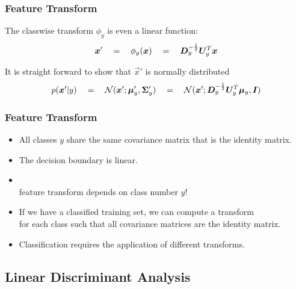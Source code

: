 \begin{frame}
  \frametitle{Feature Transform \cont}
 
  The classwise transform $\phi_y$ is even a linear function:
%
  \begin{displaymath}
    {\bm x}' \quad = \quad \phi_y({\bm x}) \quad = \quad {\bm D}_y^{-\frac{1}{2}}{\bm U}^T_y{\bm x}
  \end{displaymath}
  \pause 

  It is straight forward  to show that $\vec x'$ is normally distributed
  \begin{displaymath}
     p({\bm x}' | y) \quad = \quad \mathcal {N} ({\bm x}' ; {\bm \mu}'_y, {\bm \Sigma}'_y) 
                    \quad = \quad \mathcal {N} ({\bm x}' ; {\bm D}_y^{-\frac{1}{2}}{\bm U}^T_y{\bm \mu}_y, {\bm I}) 
  \end{displaymath}
\end{frame}


\begin{frame}
  \frametitle{Feature Transform \cont}

  
  \begin{itemize}
    \item All classes $y$ share the same covariance matrix that is the identity matrix. \\[.3cm]
    \item The decision boundary is linear. \\[.5cm] \pause
    \item \vorsicht {} \\ 
      feature transform depends on class number $y$! \\[.3cm]
    \item If we have a classified training set, we can compute a transform \\
      for each class such that all covariance matrices are the identity matrix. \\[.3cm]
    \item Classification requires the application of different transforms.
  \end{itemize}
\end{frame}



\subsection{Linear Discriminant Analysis}

